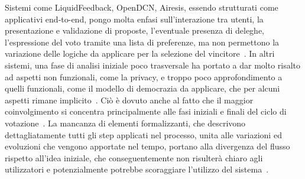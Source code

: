 \documentclass[12pt,a4paper,openright,twoside]{book}
\begin{document}
Sistemi come LiquidFeedback, OpenDCN, Airesis, essendo strutturati come applicativi end-to-end,
pongo molta enfasi sull'interazione tra utenti, la presentazione e validazione di proposte,
l'eventuale presenza di deleghe, l'espressione del voto tramite una lista di preferenze, ma
non permettono la variazione delle logiche da applicare per la selezione del vincitore~\cite{Trapanese:2018}.
In altri sistemi, una fase di analisi iniziale poco trasversale ha portato a dar molto risalto
ad aspetti non funzionali, come la privacy, e troppo poco approfondimento a quelli funzionali, come il modello di democrazia
da applicare, che per alcuni aspetti rimane implicito~\cite{Pianini:2019}.
Ciò è dovuto anche al fatto che il maggior coinvolgimento si concentra 
principalmente alle fasi iniziali e finali del ciclo di votazione~\cite{hennen2020european}.
La mancanza di elementi formalizzanti, che descrivono dettagliatamente tutti gli step applicati nel
processo, unita alle variazioni ed evoluzioni che vengono apportate nel tempo, portano alla divergenza del flusso rispetto all'idea iniziale, 
che conseguentemente non risulterà chiaro agli utilizzatori e potenzialmente potrebbe scoraggiare l'utilizzo del sistema~\cite{Pianini:2019}.
\end{document}
